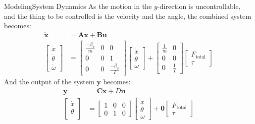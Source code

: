 \begin{frame}{Modeling}{System Dynamics}
As the motion in the $y$-direction is uncontrollable, and the thing to be controlled is the velocity and the angle, the combined system becomes:
\begin{align}
\dot{\mathbf{x}} &= \mathbf{A}\mathbf{x} + \mathbf{B}\mathbf{u}\\
\begin{bmatrix}
\ddot{x}\\
\dot{\theta}\\
\dot{\omega}
\end{bmatrix} &= \begin{bmatrix}
\frac{-\beta_x}{m} & 0 & 0\\
0 & 0 & 1\\
0 & 0 & \frac{-\beta_\omega}{I}
\end{bmatrix}\begin{bmatrix}
\dot{x}\\
\theta\\
\omega
\end{bmatrix} + \begin{bmatrix}
\frac{1}{m} & 0\\
0 & 0\\
0 & \frac{1}{I}
\end{bmatrix}\begin{bmatrix}
F_\text{total}\\
\tau
\end{bmatrix}
\end{align}
And the output of the system $\mathbf{y}$ becomes:
\begin{align}
\mathbf{y} &= \mathbf{C}\mathbf{x} + D\mathbf{u}\\
\begin{bmatrix}
\dot{x}\\
\theta\\
\end{bmatrix} &= \begin{bmatrix}
 1 & 0 & 0\\
 0 & 1 & 0
\end{bmatrix}\begin{bmatrix}
\dot{x}\\
\theta\\
\omega
\end{bmatrix} + \mathbf{0}\begin{bmatrix}
F_\text{total}\\
\tau
\end{bmatrix}
\end{align}
\end{frame}

